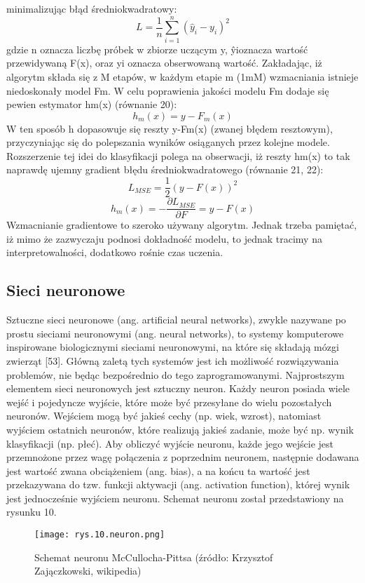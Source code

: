 \noindent minimalizując błąd średniokwadratowy:
\begin{equation}
L=\frac 1 n \sum_{i=1}^n(\hat y_i-y_i)^2
\end{equation}
gdzie n oznacza liczbę próbek w zbiorze uczącym y, ŷioznacza wartość przewidywaną F(x), oraz yi oznacza obserwowaną wartość. Zakładając, iż algorytm składa się z M etapów, w każdym etapie m (1mM) wzmacniania istnieje niedoskonały model Fm. W celu poprawienia jakości modelu Fm dodaje się pewien estymator hm(x) (równanie 20):
\begin{equation}
h_m(x)=y-F_m(x)
\end{equation}
W ten sposób h dopasowuje się reszty y-Fm(x) (zwanej błędem resztowym), przyczyniając się do polepszania wyników osiąganych przez kolejne modele. Rozszerzenie tej idei do klasyfikacji polega na obserwacji, iż reszty hm(x) to tak naprawdę ujemny gradient błędu średniokwadratowego (równanie 21, 22):
\begin{equation}
L_{MSE}=\frac 1 2(y-F(x))^2
\end{equation}
\begin{equation}
h_m(x)=-\frac {\partial L_{MSE}} {\partial F}=y-F(x)
\end{equation}
Wzmacnianie gradientowe to szeroko używany algorytm. Jednak trzeba pamiętać, iż mimo że zazwyczaju podnosi dokładność modelu, to jednak tracimy na interpretowalności, dodatkowo rośnie czas uczenia.

\subsection{Sieci neuronowe}
\label{cha:Siecineuronowe}

Sztuczne sieci neuronowe (ang. artificial neural networks), zwykle nazywane po prostu sieciami neuronowymi (ang. neural networks), to systemy komputerowe inspirowane biologicznymi sieciami neuronowymi, na które się składają mózgi zwierząt [53]. Główną zaletą tych systemów jest ich możliwość rozwiązywania problemów, nie będąc bezpośrednio do tego zaprogramowanymi. Najprostszym elementem sieci neuronowych jest sztuczny neuron. Każdy neuron posiada wiele wejść i pojedyncze wyjście, które może być przesyłane do wielu pozostałych neuronów. Wejściem mogą być jakieś cechy (np. wiek, wzrost), natomiast wyjściem ostatnich neuronów, które realizują jakieś zadanie, może być np. wynik klasyfikacji (np. płeć). Aby obliczyć wyjście neuronu, każde jego wejście jest przemnożone przez wagę połączenia z poprzednim neuronem, następnie dodawana jest wartość zwana obciążeniem (ang. bias), a na końcu ta wartość jest przekazywana do tzw. funkcji aktywacji (ang. activation function), której wynik jest jednocześnie wyjściem neuronu. Schemat neuronu został przedstawiony na rysunku 10.
\begin{figure}[h]
    \centering
    \texttt{[image: rys.10.neuron.png]}
    \caption{Schemat neuronu McCullocha-Pittsa (źródło: Krzysztof Zajączkowski, wikipedia)}
    \label{fig:mesh10}
\end{figure}

